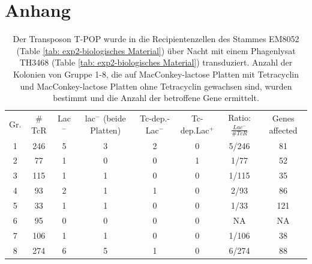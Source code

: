 \documentclass[oneside,10pt,a4paper]{report}
\begin{document}
	
	
	\chapter{Anhang}
\begin{table}[H]
	\centering
	\caption{Der Transposon T-POP wurde in die Recipientenzellen des Stammes EM8052 (Table \ref{tab: exp2-biologisches Material}) über Nacht mit einem Phagenlysat TH3468 (Table \ref{tab: exp2-biologisches Material}) transduziert. Anzahl der Kolonien von Gruppe 1-8, die auf MacConkey-lactose Platten mit Tetracyclin und MacConkey-lactose Platten ohne Tetracyclin gewachsen sind, wurden bestimmt und die Anzahl der betroffene Gene ermittelt.}
	\label{tab: exp2-Rohdaten}
	\begin{tabular}{cccccccc}
		\toprule
		\multirow{2}{*}{Gr.} & \multirow{2}{*}{$\#$TcR} & \multirow{2}{*}{Lac$^-$}&\multirow{2}{*}{lac$^-$ (beide Platten)} & \multirow{2}{*}{Tc-dep.-Lac$^-$}& \multirow{2}{*}{Tc-dep.Lac$^+$}& \multirow{2}{*}{Ratio: $\frac{Lac^-}{\#TcR}$}&\multirow{2}{*}{\parbox[*]{1.2cm}{Genes affected}}\\
		&&&&&&&\\
		\midrule
		1 & 246 & 5 & 3 & 2 & 0 & 5/246 & 81\\
		2 & 77 & 1 & 0 & 0 & 1 & 1/77 & 52\\
		3 & 115 & 1 & 1 & 0 & 0 & 1/115& 35\\
		4 & 93 & 2 & 1 & 1 & 0 & 2/93 & 86\\
		5 & 33 & 1 & 1 & 0 & 0 & 1/33& 121\\
		6 & 95 & 0 & 0 & 0 & 0 & NA & NA\\
		7 & 106 & 1 & 1 & 0 & 0 & 1/106 & 38\\
		8 & 274 & 6 & 5 & 1 & 0 & 6/274 & 88\\
		\bottomrule			
	\end{tabular}
\end{table}
	
	
	
	
	\nocite{*}
	
	\newpage
\end{document}

